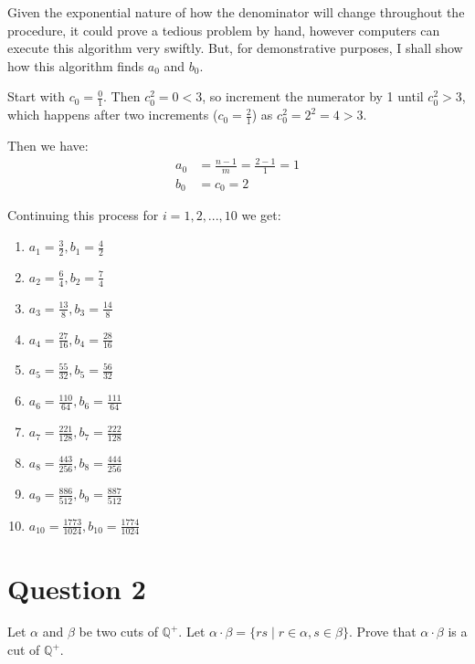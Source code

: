 \documentclass[12pt, letterpaper]{article}
\begin{document}
\noindent Given the exponential nature of how the denominator will change throughout the procedure, it could prove a tedious problem by hand, however computers can execute this algorithm very swiftly.
But, for demonstrative purposes, I shall show how this algorithm finds $a_0$ and $b_0$.

Start with $c_0 = \frac{0}{1}$. Then $c_0^2 = 0 < 3$, so increment the numerator by 1 until $c_0^2 > 3$, which happens after two increments ($c_0 = \frac{2}{1}$) as $c_0^2 = 2^2 = 4 > 3$.

\noindent Then we have:
\begin{equation}
\begin{split}
a_0 & = \frac{n - 1}{m} = \frac{2 - 1}{1} = 1 \\
b_0 & = c_0 = 2
\end{split}
\end{equation}

\noindent Continuing this process for $i = 1, 2, ..., 10$ we get:
\begin{enumerate}
  \item $a_1 = \frac{3}{2}, b_1 = \frac{4}{2}$
  \item $a_2 = \frac{6}{4}, b_2 = \frac{7}{4}$
  \item $a_3 = \frac{13}{8}, b_3 = \frac{14}{8}$
  \item $a_4 = \frac{27}{16}, b_4 = \frac{28}{16}$
  \item $a_5 = \frac{55}{32}, b_5 = \frac{56}{32}$
  \item $a_6 = \frac{110}{64}, b_6 = \frac{111}{64}$
  \item $a_7 = \frac{221}{128}, b_7 = \frac{222}{128}$
  \item $a_8 = \frac{443}{256}, b_8 = \frac{444}{256}$
  \item $a_9 = \frac{886}{512}, b_9 = \frac{887}{512}$
  \item $a_{10} = \frac{1773}{1024}, b_{10} = \frac{1774}{1024}$
\end{enumerate}
\pagebreak
\section*{Question 2}
Let $\alpha$ and $\beta$ be two cuts of $\mathbb{Q}^+$. Let $\alpha \cdot \beta = \{ rs \mid r \in \alpha, s \in \beta \}$. Prove that $\alpha \cdot \beta$ is a cut of $\mathbb{Q}^+$.
\end{document}
